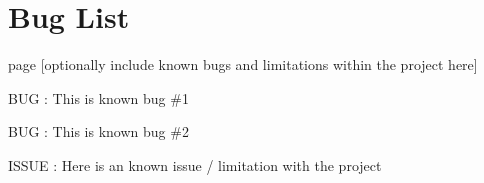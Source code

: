 \chapter{Bug List}
\hypertarget{bug}{}\label{bug}

\begin{DoxyRefList}
\item[page \doxylink{index}{Shapes Project } ]\label{bug__bug000001}%
%
\mbox{[}optionally include known bugs and limitations within the project here\mbox{]}
\begin{DoxyItemize}
\item BUG \+: This is known bug \#1
\item BUG \+: This is known bug \#2
\item ISSUE \+: Here is an known issue / limitation with the project
\end{DoxyItemize}
\end{DoxyRefList}